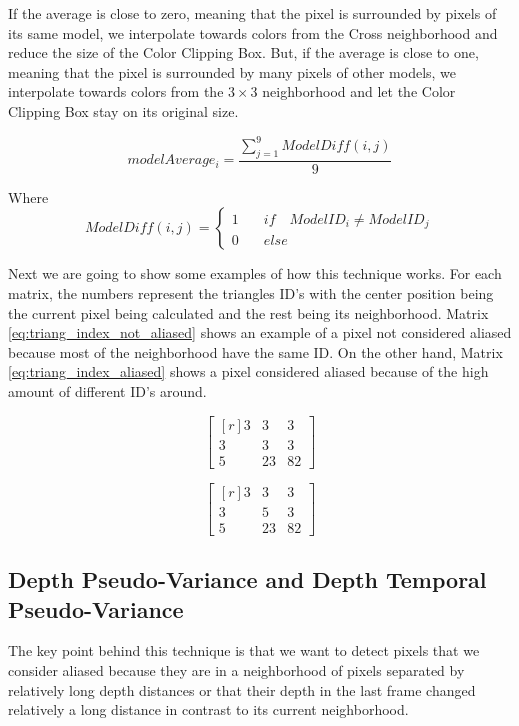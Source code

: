 \documentclass[pregrado]{tesis-usb} %
\begin{document}
If the average is close to zero, meaning that the pixel is surrounded by pixels of its same model, we interpolate towards colors from the Cross neighborhood and reduce the size of the Color Clipping Box. But, if the average is close to one, meaning that the pixel is surrounded by many pixels of other models, we interpolate towards colors from the $3\times 3$ neighborhood and let the Color Clipping Box stay on its original size.

\begin{equation}\label{eq:model_index_acc}
modelAverage_i = \frac{\sum\limits_{j=1}^{9} ModelDiff(i,j)}{9} 
\end{equation}

Where
\begin{equation*}
ModelDiff(i,j) = \left\lbrace \begin{split}1\quad & if\quad ModelID_i \neq ModelID_j \\ 0\quad & else\end{split} \right.
\end{equation*}

Next we are going to show some examples of how this technique works. For each matrix, the numbers represent the triangles ID's with the center position being the current pixel being calculated and the rest being its neighborhood. Matrix \ref{eq:triang_index_not_aliased} shows an example of a pixel not considered aliased because most of the neighborhood have the same ID. On the other hand, Matrix \ref{eq:triang_index_aliased} shows a pixel considered aliased because of the high amount of different ID's around.

\begin{equation}
\begin{bmatrix*}[r]\label{eq:triang_index_not_aliased}
3 &  3 & 3 \\
3 &  3 & 3 \\
5 &  23 & 82
\end{bmatrix*}
\end{equation}

\begin{equation}
\begin{bmatrix*}[r]\label{eq:triang_index_aliased}
3 &  3 & 3 \\
3 &  5 & 3 \\
5 &  23 & 82
\end{bmatrix*}
\end{equation}

\subsection{Depth Pseudo-Variance and Depth Temporal Pseudo-Variance}
The key point behind this technique is that we want to detect pixels that we consider aliased because they are in a neighborhood of pixels separated by relatively long depth distances or that their depth in the last frame changed relatively a long distance in contrast to its current neighborhood.
\end{document}
